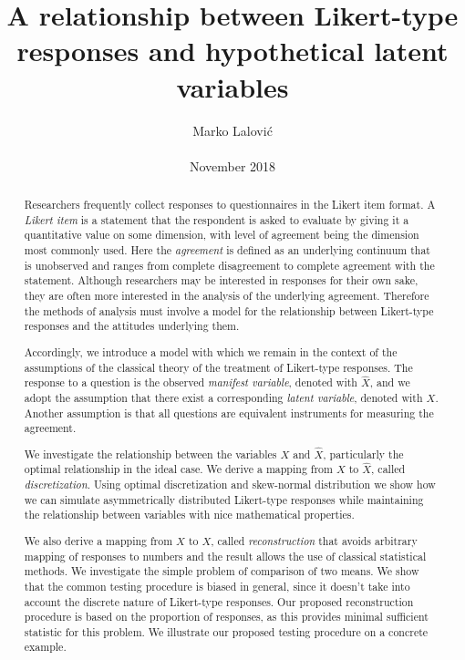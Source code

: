 \documentclass[10pt]{article}
\begin{document}
\title{A relationship between Likert-type responses and hypothetical latent variables}
\author{Marko Lalović \\
\\
November 2018 \\
}

\maketitle
\thispagestyle{empty}

\begin{abstract}
Researchers frequently collect responses to questionnaires in the Likert item format. A {\it Likert item} is a statement that the respondent is asked to evaluate by giving it a quantitative value on some dimension, with level of agreement being the dimension most commonly used. Here the {\it agreement} is defined as an underlying continuum that is unobserved and ranges from complete disagreement to complete agreement with the statement. Although researchers may be interested in responses for their own sake, they are often more interested in the analysis of the underlying agreement. Therefore the methods of analysis must involve a model for the relationship between Likert-type responses and the attitudes underlying them.

Accordingly, we introduce a model with which we remain in the context of the assumptions of the classical theory of the treatment of Likert-type responses. The response to a question is the observed {\it manifest variable}, denoted with $\hat{X}$, and we adopt the assumption that there exist a corresponding {\it latent variable}, denoted with $X$. Another assumption is that all questions are equivalent instruments for measuring the agreement.

We investigate the relationship between the variables $X$ and $\hat{X}$, particularly the optimal relationship in the ideal case. We derive a mapping from $X$ to $\hat{X}$, called {\it discretization}. Using optimal discretization and skew-normal distribution we show how we can simulate asymmetrically distributed Likert-type responses while maintaining the relationship between variables with nice mathematical properties. 

We also derive a mapping from $\hat{X}$ to $X$, called {\it reconstruction} that avoids arbitrary mapping of responses to numbers and the result allows the use of classical statistical methods. We investigate the simple problem of comparison of two means. We show that the common testing procedure is biased in general, since it doesn't take into account the discrete nature of Likert-type responses. Our proposed reconstruction procedure is based on the proportion of responses, as this provides minimal sufficient statistic for this problem. We illustrate our proposed testing procedure on a concrete example.
\end{abstract}
\end{document}
